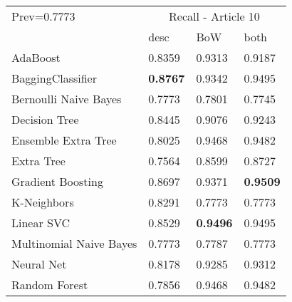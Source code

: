 \begin{tabular}{|l|l|l|l| }
\hline
Prev=0.7773 &  \multicolumn{3}{c|}{Recall - Article 10} \\
\cline{2-4} & desc & BoW & both \\ \hline
AdaBoost                & 0.8359 & 0.9313 & 0.9187\\
BaggingClassifier       & {\bf 0.8767} & 0.9342 & 0.9495\\
Bernoulli Naive Bayes   & 0.7773 & 0.7801 & 0.7745\\
Decision Tree           & 0.8445 & 0.9076 & 0.9243\\
Ensemble Extra Tree     & 0.8025 & 0.9468 & 0.9482\\
Extra Tree              & 0.7564 & 0.8599 & 0.8727\\
Gradient Boosting       & 0.8697 & 0.9371 & {\bf 0.9509}\\
K-Neighbors             & 0.8291 & 0.7773 & 0.7773\\
Linear SVC              & 0.8529 & {\bf 0.9496} & 0.9495\\
Multinomial Naive Bayes & 0.7773 & 0.7787 & 0.7773\\
Neural Net              & 0.8178 & 0.9285 & 0.9312\\
Random Forest           & 0.7856 & 0.9468 & 0.9482\\
\hline
\end{tabular}